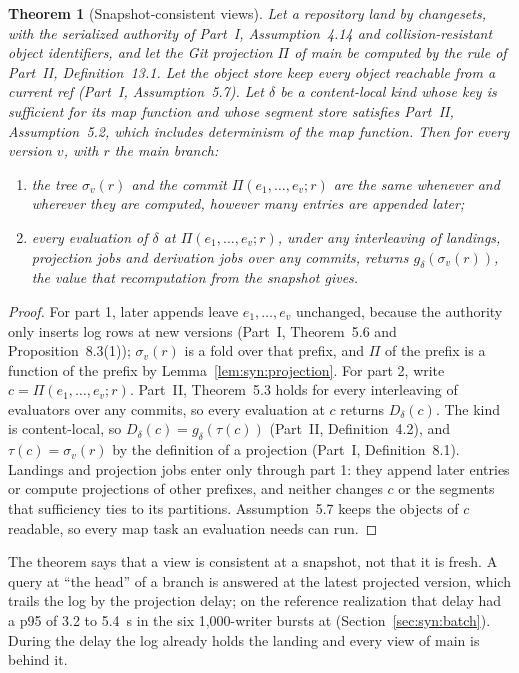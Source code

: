 \documentclass[11pt,letterpaper]{article}
\newtheorem{theorem}{Theorem}[section]
\theoremstyle{definition}
\theoremstyle{remark}
\newcommand{\tree}{\tau}
\begin{document}
\begin{theorem}[Snapshot-consistent views]
\label{thm:syn:consistent}
Let a repository land by changesets, with the serialized authority of Part~I, Assumption~4.14 and collision-resistant object identifiers, and let the Git projection $\Pi$ of main be computed by the rule of Part~II, Definition~13.1. Let the object store keep every object reachable from a current ref (Part~I, Assumption~5.7). Let $\delta$ be a content-local kind whose key is sufficient for its map function and whose segment store satisfies Part~II, Assumption~5.2, which includes determinism of the map function. Then for every version $v$, with $r$ the main branch:
\begin{enumerate}
\item the tree $\sigma_v(r)$ and the commit $\Pi(e_1,\dots,e_v;r)$ are the same whenever and wherever they are computed, however many entries are appended later;
\item every evaluation of $\delta$ at $\Pi(e_1,\dots,e_v;r)$, under any interleaving of landings, projection jobs and derivation jobs over any commits, returns $g_\delta(\sigma_v(r))$, the value that recomputation from the snapshot gives.
\end{enumerate}
\end{theorem}

\begin{proof}
For part 1, later appends leave $e_1,\dots,e_v$ unchanged, because the authority only inserts log rows at new versions (Part~I, Theorem~5.6 and Proposition~8.3(1)); $\sigma_v(r)$ is a fold over that prefix, and $\Pi$ of the prefix is a function of the prefix by Lemma~\ref{lem:syn:projection}. For part 2, write $c=\Pi(e_1,\dots,e_v;r)$. Part~II, Theorem~5.3 holds for every interleaving of evaluators over any commits, so every evaluation at $c$ returns $D_\delta(c)$. The kind is content-local, so $D_\delta(c)=g_\delta(\tree(c))$ (Part~II, Definition~4.2), and $\tree(c)=\sigma_v(r)$ by the definition of a projection (Part~I, Definition~8.1). Landings and projection jobs enter only through part 1: they append later entries or compute projections of other prefixes, and neither changes $c$ or the segments that sufficiency ties to its partitions. Assumption~5.7 keeps the objects of $c$ readable, so every map task an evaluation needs can run.
\end{proof}

The theorem says that a view is consistent at a snapshot, not that it is fresh. A query at ``the head'' of a branch is answered at the latest projected version, which trails the log by the projection delay; on the reference realization that delay had a p95 of 3.2 to 5.4~s in the six 1,000-writer bursts at  (Section~\ref{sec:syn:batch}). %
During the delay the log already holds the landing and every view of main is behind it.
\end{document}
